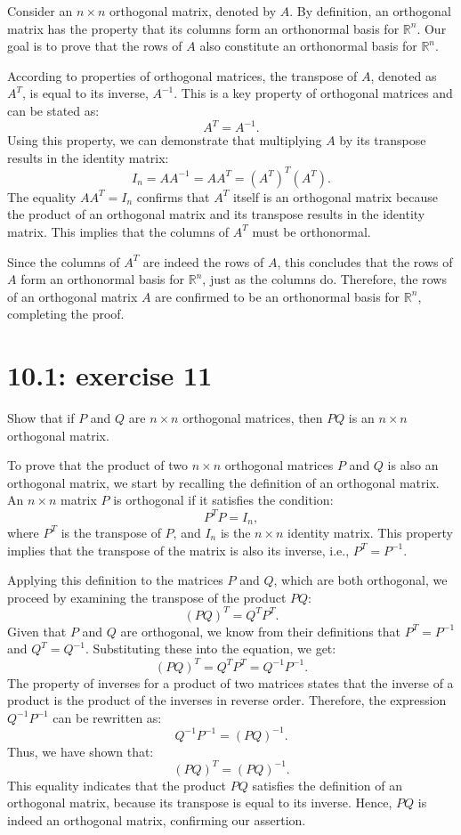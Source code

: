 \documentclass{report}
\begin{document}
\sol
Consider an $n \times n$ orthogonal matrix, denoted by $A$. By definition, an orthogonal matrix has the property that its columns form an orthonormal basis for $\mathbb{R}^n$. Our goal is to prove that the rows of $A$ also constitute an orthonormal basis for $\mathbb{R}^n$.

According to properties of orthogonal matrices, the transpose of $A$, denoted as $A^T$, is equal to its inverse, $A^{-1}$. This is a key property of orthogonal matrices and can be stated as:
\[
A^T = A^{-1}.
\]
Using this property, we can demonstrate that multiplying $A$ by its transpose results in the identity matrix:
\[
I_n = AA^{-1} = AA^T = (A^T)^T(A^T).
\]
The equality $AA^T = I_n$ confirms that $A^T$ itself is an orthogonal matrix because the product of an orthogonal matrix and its transpose results in the identity matrix. This implies that the columns of $A^T$ must be orthonormal.

Since the columns of $A^T$ are indeed the rows of $A$, this concludes that the rows of $A$ form an orthonormal basis for $\mathbb{R}^n$, just as the columns do. Therefore, the rows of an orthogonal matrix $A$ are confirmed to be an orthonormal basis for $\mathbb{R}^n$, completing the proof.


\section*{10.1: exercise 11} 

Show that if \(P\) and \(Q\) are \(n \times n\) orthogonal matrices, then \(PQ\) is an \(n \times n\) orthogonal matrix.\\


\sol


To prove that the product of two \(n \times n\) orthogonal matrices \(P\) and \(Q\) is also an orthogonal matrix, we start by recalling the definition of an orthogonal matrix. An \(n \times n\) matrix \(P\) is orthogonal if it satisfies the condition:
\[
P^T P = I_n,
\]
where \(P^T\) is the transpose of \(P\), and \(I_n\) is the \(n \times n\) identity matrix. This property implies that the transpose of the matrix is also its inverse, i.e., \(P^T = P^{-1}\).

Applying this definition to the matrices \(P\) and \(Q\), which are both orthogonal, we proceed by examining the transpose of the product \(PQ\):
\[
(PQ)^T = Q^T P^T.
\]
Given that \(P\) and \(Q\) are orthogonal, we know from their definitions that \(P^T = P^{-1}\) and \(Q^T = Q^{-1}\). Substituting these into the equation, we get:
\[
(PQ)^T = Q^T P^T = Q^{-1} P^{-1}.
\]
The property of inverses for a product of two matrices states that the inverse of a product is the product of the inverses in reverse order. Therefore, the expression \(Q^{-1} P^{-1}\) can be rewritten as:
\[
Q^{-1} P^{-1} = (PQ)^{-1}.
\]
Thus, we have shown that:
\[
(PQ)^T = (PQ)^{-1}.
\]
This equality indicates that the product \(PQ\) satisfies the definition of an orthogonal matrix, because its transpose is equal to its inverse. Hence, \(PQ\) is indeed an orthogonal matrix, confirming our assertion.
\end{document}
